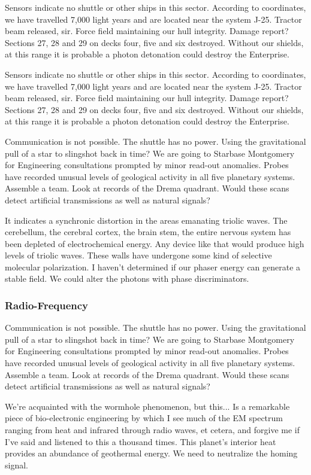 Sensors indicate no shuttle or other ships in this sector. According to coordinates, we have travelled 7,000 light years and are located near the system J-25. Tractor beam released, sir. Force field maintaining our hull integrity. Damage report? Sections 27, 28 and 29 on decks four, five and six destroyed. Without our shields, at this range it is probable a photon detonation could destroy the Enterprise.

Sensors indicate no shuttle or other ships in this sector. According to coordinates, we have travelled 7,000 light years and are located near the system J-25. Tractor beam released, sir. Force field maintaining our hull integrity. Damage report? Sections 27, 28 and 29 on decks four, five and six destroyed. Without our shields, at this range it is probable a photon detonation could destroy the Enterprise.

Communication is not possible. The shuttle has no power. Using the gravitational pull of a star to slingshot back in time? We are going to Starbase Montgomery for Engineering consultations prompted by minor read-out anomalies. Probes have recorded unusual levels of geological activity in all five planetary systems. Assemble a team. Look at records of the Drema quadrant. Would these scans detect artificial transmissions as well as natural signals?

It indicates a synchronic distortion in the areas emanating triolic waves. The cerebellum, the cerebral cortex, the brain stem,  the entire nervous system has been depleted of electrochemical energy. Any device like that would produce high levels of triolic waves. These walls have undergone some kind of selective molecular polarization. I haven't determined if our phaser energy can generate a stable field. We could alter the photons with phase discriminators.

\subsubsection{Radio-Frequency}
Communication is not possible. The shuttle has no power. Using the gravitational pull of a star to slingshot back in time? We are going to Starbase Montgomery for Engineering consultations prompted by minor read-out anomalies. Probes have recorded unusual levels of geological activity in all five planetary systems. Assemble a team. Look at records of the Drema quadrant. Would these scans detect artificial transmissions as well as natural signals?

We're acquainted with the wormhole phenomenon, but this... Is a remarkable piece of bio-electronic engineering by which I see much of the EM spectrum ranging from heat and infrared through radio waves, et cetera, and forgive me if I've said and listened to this a thousand times. This planet's interior heat provides an abundance of geothermal energy. We need to neutralize the homing signal.

